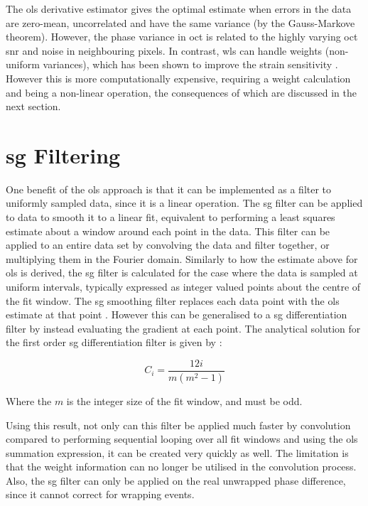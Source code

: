 The \ac{ols} derivative estimator gives the optimal estimate when errors in the data are zero-mean, uncorrelated and have the same variance (by the Gauss-Markove theorem). However, the phase variance in \ac{oct} is related to the highly varying \ac{oct} \ac{snr} and noise in neighbouring pixels. In contrast, \ac{wls} can handle weights (non-uniform variances), which has been shown to improve the strain sensitivity \cite{kennedy_strain_2012}. However this is more computationally expensive, requiring a weight calculation and being a non-linear operation, the consequences of which are discussed in the next section.

\section{\ac{sg} Filtering}\label{sg_filter}
One benefit of the \ac{ols} approach is that it can be implemented as a filter to uniformly sampled data, since it is a linear operation. The \ac{sg} filter \cite{savitzky_smoothing_1964} can be applied to data to smooth it to a linear fit, equivalent to performing a least squares estimate about a window around each point in the data. This filter can be applied to an entire data set by convolving the data and filter together, or multiplying them in the Fourier domain. 
Similarly to how the estimate above for \ac{ols} is derived, the \ac{sg} filter is calculated for the case where the data is sampled at uniform intervals, typically expressed as integer valued points about the centre of the fit window. The \ac{sg} smoothing filter replaces each data point with the \ac{ols} estimate at that point \cite{savitzky_smoothing_1964}. However this can be generalised to a \ac{sg} differentiation filter by instead evaluating the gradient at each point. 
The analytical solution for the first order \ac{sg} differentiation filter is given by \cite{madden_comments_1978}:

\begin{equation}
	\label{sg_coeff}
	C_i = \frac{12 i}{m(m^2-1)}
\end{equation}

Where the $m$ is the integer size of the fit window, and must be odd.

Using this result, not only can this filter be applied much faster by convolution compared to performing sequential looping over all fit windows and using the \ac{ols} summation expression, it can be created very quickly as well. The limitation is that the weight information can no longer be utilised in the convolution process. Also, the \ac{sg} filter can only be applied on the real unwrapped phase difference, since it cannot correct for wrapping events. 


